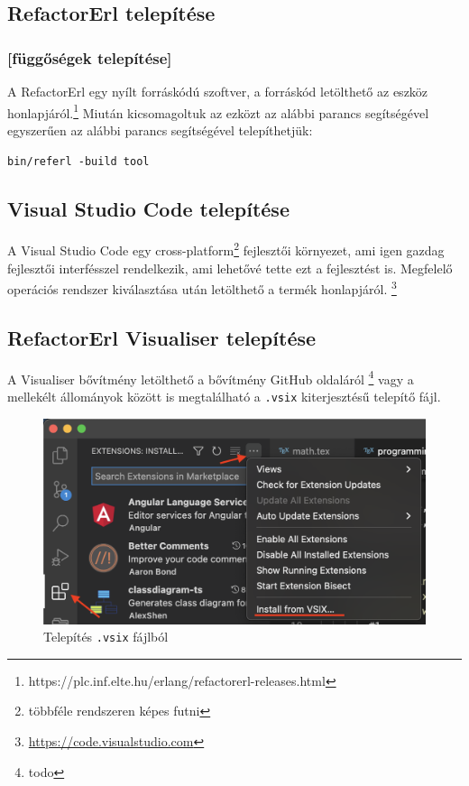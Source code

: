 \subsection{RefactorErl telepítése}


\subsubsection{[függőségek telepítése]}

A RefactorErl egy nyílt forráskódú szoftver, a forráskód letölthető az eszköz honlapjáról.\footnote{https://plc.inf.elte.hu/erlang/refactorerl-releases.html} Miután kicsomagoltuk az ezközt az alábbi parancs segítségével egyszerűen az alábbi parancs segítségével telepíthetjük:

\lstinline{bin/referl -build tool}


\subsection{Visual Studio Code telepítése}
A Visual Studio Code egy cross-platform\footnote{többféle rendszeren képes futni} fejlesztői környezet, ami igen gazdag fejlesztői interfésszel rendelkezik, ami lehetővé tette ezt a fejlesztést is. Megfelelő operációs rendszer kiválasztása után letölthető a termék honlapjáról. \footnote{\url{https://code.visualstudio.com}}

\subsection{RefactorErl Visualiser telepítése}
A Visualiser bővítmény letölthető a bővítmény GitHub oldaláról \footnote{todo} vagy a mellekélt állományok között is megtalálható a \lstinline{.vsix} kiterjesztésű telepítő fájl. 


\begin{figure}[H]
  \centering
  \includegraphics[width=\linewidth]{images/vsix_install.png}
  \caption{Telepítés \lstinline{.vsix} fájlból}
  \label{fig:vsix_install}
\end{figure}

